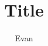 \documentclass[11 pt]{article}
\author{Evan }
\title{Title}
\begin{document}
\maketitle

\begin{section}
    
\end{section}
\end{document}
